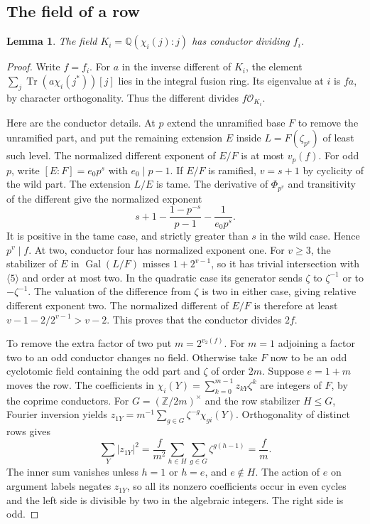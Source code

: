 \documentclass[11pt]{amsart}
\numberwithin{equation}{section}
\newtheorem{lemma}[theorem]{Lemma}
\begin{document}
\subsection{The field of a row}
\begin{lemma}\label{conduct}
The field $K_i=\mathbb Q(\chi_i(j):j)$ has conductor dividing $f_i$.
\end{lemma}
\begin{proof}
Write $f=f_i$. For $a$ in the inverse different of $K_i$, the
element $\sum_j\operatorname{Tr}(a\chi_i(j^*))[j]$ lies in the
integral fusion ring. Its eigenvalue at $i$ is $fa$, by character
orthogonality. Thus the different divides $f\mathcal O_{K_i}$.

Here are the conductor details. At $p$ extend the unramified base
$F$ to remove the unramified part, and put the remaining extension
$E$ inside $L=F(\zeta_{p^v})$ of least such level. The normalized
different exponent of $E/F$ is at most $v_p(f)$. For odd $p$, write
$[E:F]=e_0p^s$ with $e_0\mid p-1$. If $E/F$ is ramified,
$v=s+1$ by cyclicity of the wild part. The extension $L/E$ is tame.
The derivative of $\Phi_{p^v}$ and transitivity of the different
give the normalized exponent
\[
 s+1-\frac{1-p^{-s}}{p-1}-\frac1{e_0p^s}.
\]
It is positive in the tame case, and strictly greater than $s$ in
the wild case. Hence $p^v\mid f$. At two, conductor four has
normalized exponent one. For $v\ge3$, the stabilizer of $E$ in
$\operatorname{Gal}(L/F)$ misses $1+2^{v-1}$, so it has trivial
intersection with $\langle5\rangle$ and order at most two.
In the quadratic case its generator sends $\zeta$ to $\zeta^{-1}$
or to $-\zeta^{-1}$. The valuation of the difference from $\zeta$
is two in either case, giving relative different exponent two.
The normalized different of $E/F$ is therefore at least
$v-1-2/2^{v-1}>v-2$. This proves that the conductor divides $2f$.

To remove the extra factor of two put $m=2^{v_2(f)}$. For $m=1$
adjoining a factor two to an odd conductor changes no field.
Otherwise take $F$ now to be an odd cyclotomic field containing the
odd part and $\zeta$ of order $2m$. Suppose $e=1+m$ moves the row.
The coefficients in
$\chi_i(Y)=\sum_{k=0}^{m-1}z_{kY}\zeta^k$ are integers of $F$,
by the coprime conductors. For $G=(\mathbb Z/2m)^\times$ and
the row stabilizer $H\le G$, Fourier inversion yields
$z_{1Y}=m^{-1}\sum_{g\in G}\zeta^{-g}\chi_{gi}(Y)$.
Orthogonality of distinct rows gives
\[
 \sum_Y|z_{1Y}|^2
 =\frac f{m^2}\sum_{h\in H}\sum_{g\in G}\zeta^{g(h-1)}
 =\frac f m .
\]
The inner sum vanishes unless $h=1$ or $h=e$, and $e\notin H$.
The action of $e$ on argument labels negates $z_{1Y}$, so all its
nonzero coefficients occur in even cycles and the left side is
divisible by two in the algebraic integers. The right side is odd.
\end{proof}
\end{document}
